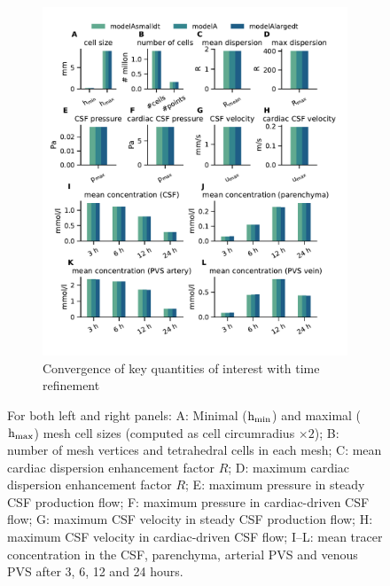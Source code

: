 \begin{figure}
\begin{subfigure}[b]{0.49\textwidth}
     \includegraphics[trim={0.5cm 1cm 0.05cm 0.8cm}, clip,width= 1.05 \linewidth]{figures/modelAsmalldt_modelA_modelAlargedt.pdf}
        \caption*{Convergence of key quantities of interest with time refinement}
    \end{subfigure}
    \caption{For both left and right panels: A: Minimal ($\rm h_{min}$) and maximal ($\rm h_{max}$) mesh cell sizes (computed as cell circumradius $\times 2$); B: number of mesh vertices and tetrahedral cells in each mesh; C: mean cardiac dispersion enhancement factor $R$; D: maximum cardiac dispersion enhancement factor $R$; E: maximum pressure in steady CSF production flow; F: maximum pressure in cardiac-driven CSF flow; G: maximum CSF velocity in steady CSF production flow; H: maximum CSF velocity in cardiac-driven CSF flow; I--L: mean tracer concentration in the CSF, parenchyma, arterial PVS and venous PVS after 3, 6, 12 and 24 hours.}
        \label{fig:mesh_time_convergence}
\end{figure}

